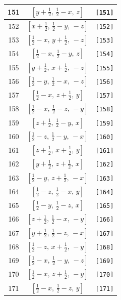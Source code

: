 \documentclass[fleqn,8pt]{jsarticle}
\begin{document}
\begin{longtable}{ccc}
151 & $\left[ y + \frac{1}{2},\, \frac{1}{2} - x,\, z \right]$ & {\tt [151]} \\ \hline
152 & $\left[ x + \frac{1}{2},\, \frac{1}{2} - y,\, - z \right]$ & {\tt [152]} \\ \hline
153 & $\left[ \frac{1}{2} - x,\, y + \frac{1}{2},\, - z \right]$ & {\tt [153]} \\ \hline
154 & $\left[ \frac{1}{2} - x,\, \frac{1}{2} - y,\, z \right]$ & {\tt [154]} \\ \hline
155 & $\left[ y + \frac{1}{2},\, x + \frac{1}{2},\, - z \right]$ & {\tt [155]} \\ \hline
156 & $\left[ \frac{1}{2} - y,\, \frac{1}{2} - x,\, - z \right]$ & {\tt [156]} \\ \hline
157 & $\left[ \frac{1}{2} - x,\, z + \frac{1}{2},\, y \right]$ & {\tt [157]} \\ \hline
158 & $\left[ \frac{1}{2} - x,\, \frac{1}{2} - z,\, - y \right]$ & {\tt [158]} \\ \hline
159 & $\left[ z + \frac{1}{2},\, \frac{1}{2} - y,\, x \right]$ & {\tt [159]} \\ \hline
160 & $\left[ \frac{1}{2} - z,\, \frac{1}{2} - y,\, - x \right]$ & {\tt [160]} \\ \hline
161 & $\left[ z + \frac{1}{2},\, x + \frac{1}{2},\, y \right]$ & {\tt [161]} \\ \hline
162 & $\left[ y + \frac{1}{2},\, z + \frac{1}{2},\, x \right]$ & {\tt [162]} \\ \hline
163 & $\left[ \frac{1}{2} - y,\, z + \frac{1}{2},\, - x \right]$ & {\tt [163]} \\ \hline
164 & $\left[ \frac{1}{2} - z,\, \frac{1}{2} - x,\, y \right]$ & {\tt [164]} \\ \hline
165 & $\left[ \frac{1}{2} - y,\, \frac{1}{2} - z,\, x \right]$ & {\tt [165]} \\ \hline
166 & $\left[ z + \frac{1}{2},\, \frac{1}{2} - x,\, - y \right]$ & {\tt [166]} \\ \hline
167 & $\left[ y + \frac{1}{2},\, \frac{1}{2} - z,\, - x \right]$ & {\tt [167]} \\ \hline
168 & $\left[ \frac{1}{2} - z,\, x + \frac{1}{2},\, - y \right]$ & {\tt [168]} \\ \hline
169 & $\left[ \frac{1}{2} - x,\, \frac{1}{2} - y,\, - z \right]$ & {\tt [169]} \\ \hline
170 & $\left[ \frac{1}{2} - x,\, z + \frac{1}{2},\, - y \right]$ & {\tt [170]} \\ \hline
171 & $\left[ \frac{1}{2} - x,\, \frac{1}{2} - z,\, y \right]$ & {\tt [171]} \\ \hline

\end{longtable}
\end{document}
